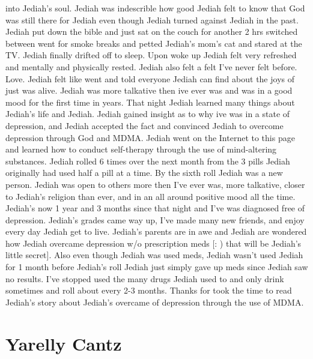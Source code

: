 \documentclass[12pt]{book}
\begin{document}
into Jediah's soul. Jediah was indescrible how good Jediah felt to know that God was still there for Jediah even though Jediah turned against Jediah in the past. Jediah put down the bible and just sat on the couch for another 2 hrs switched between went for smoke breaks and petted Jediah's mom's cat and stared at the TV. Jediah finally drifted off to sleep. Upon woke up Jediah felt very refreshed and mentally and physically rested. Jediah also felt a felt I've never felt before. Love. Jediah felt like went and told everyone Jediah can find about the joys of just was alive. Jediah was more talkative then ive ever was and was in a good mood for the first time in years. That night Jediah learned many things about Jediah's life and Jediah. Jediah gained insight as to why ive was in a state of depression, and Jediah accepted the fact and convinced Jediah to overcome depression through God and MDMA. Jediah went on the Internet to this page and learned how to conduct self-therapy through the use of mind-altering substances. Jediah rolled 6 times over the next month from the 3 pills Jediah originally had used half a pill at a time. By the sixth roll Jediah was a new person. Jediah was open to others more then I've ever was, more talkative, closer to Jediah's religion than ever, and in an all around positive mood all the time. Jediah's now 1 year and 3 months since that night and I've was diagnosed free of depression. Jediah's grades came way up, I've made many new friends, and enjoy every day Jediah get to live. Jediah's parents are in awe and Jediah are wondered how Jediah overcame depression w/o prescription meds [: ) that will be Jediah's little secret]. Also even though Jediah was used meds, Jediah wasn't used Jediah for 1 month before Jediah's roll Jediah just simply gave up meds since Jediah saw no results. I've stopped used the many drugs Jediah used to and only drink sometimes and roll about every 2-3 months. Thanks for took the time to read Jediah's story about Jediah's overcame of depression through the use of MDMA.



\chapter{Yarelly Cantz}
\end{document}
